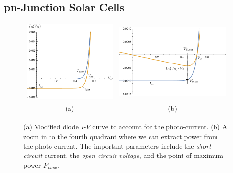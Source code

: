 \subsection{pn-Junction Solar Cells}
\begin{figure}[tb]
\begin{center}
\begin{tabular}{cc}
\includegraphics[width=.5\columnwidth]{solarcell_zoomout.pdf} &
\includegraphics[width=.5\columnwidth]{solarcell.pdf} \\
(a) & (b) \\
\end{tabular}
\end{center}
\caption{(a) Modified diode $I$-$V$ curve to account for the photo-current.  (b)  A zoom in to the fourth quadrant where we can extract power from the photo-current.  The important parameters include the \emph{short circuit} current, the \emph{open circuit voltage}, and the point of maximum power $P_{max}$. }
\label{fig:solarcell_zoom}
\end{figure}

